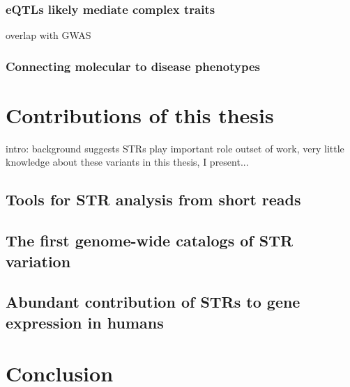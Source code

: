 \subsubsection{eQTLs likely mediate complex traits}
overlap with GWAS
\subsubsection{Connecting molecular to disease phenotypes}

\section{Contributions of this thesis}
intro: background suggests STRs play important role
outset of work, very little knowledge about these variants
in this thesis, I present...
\subsection{Tools for STR analysis from short reads}
\subsection{The first genome-wide catalogs of STR variation}
\subsection{Abundant contribution of STRs to gene expression in humans}

\section{Conclusion}